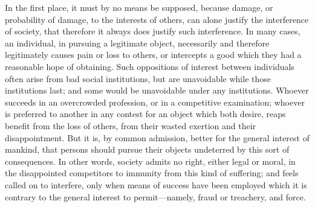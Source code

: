 \documentclass[11pt,openany]{book}
\begin{document}
In the first place, it must by no means be supposed, because damage, or probability of damage, to the interests of others, can alone justify the interference of society, that therefore it always does justify such interference. In many cases, an individual, in pursuing a legitimate object, necessarily and therefore legitimately causes pain or loss to others, or intercepts a good which they had a reasonable hope of obtaining. Such oppositions of interest between individuals often arise from bad social institutions, but are unavoidable while those institutions last; and some would be unavoidable under any institutions. Whoever succeeds in an overcrowded profession, or in a competitive examination; whoever is preferred to another in any contest for an object which both desire, reaps benefit from the loss of others, from their wasted exertion and their disappointment. But it is, by common admission, better for the general interest of mankind, that persons should pursue their objects undeterred by this sort of consequences. In other words, society admits no right, either legal or moral, in the disappointed competitors to immunity from this kind of suffering; and feels called on to interfere, only when means of success have been employed which it is contrary to the general interest to permit---namely, fraud or treachery, and force.
\end{document}

